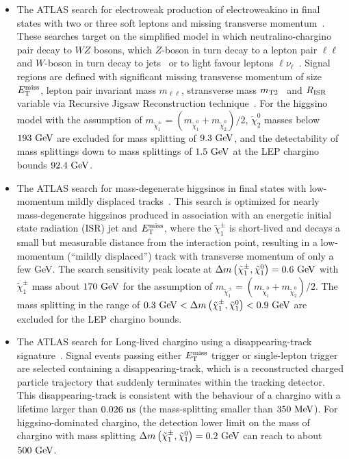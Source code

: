 \documentclass[letterpaper,11pt]{article}
\begin{document}
\begin{itemize}
	\item The ATLAS search for electroweak production of electroweakino in final states with two or three soft leptons and missing transverse momentum~\cite{ATLAS:2021moa, ATLAS:2019lng}. These searches target on the simplified model in which neutralino-chargino pair decay to $WZ$ bosons, which $Z$-boson in turn decay to a lepton pair $\ell\ell$ and $W$-boson in turn decay to jets~\cite{ATLAS:2019lng} or to light favour leptons $\ell\nu_\ell$~\cite{ATLAS:2021moa}. Signal regions are defined with significant missing transverse momentum of size $E_{\rm T}^{\rm miss}$, lepton pair invariant mass $m_{\ell\ell}$, stransverse mass $m_{\rm T2}$~\cite{Barr:2003rg, Lester:1999tx} and $R_{\rm ISR}$ variable via Recursive Jigsaw Reconstruction technique~\cite{Jackson:2017gcy}. For the higgsino model with the assumption of $m_{\tilde{\chi}_1^\pm} = \left( m_{\tilde{\chi}_1^0} + m_{\tilde{\chi}_2^0} \right) \big/2$, $\tilde{\chi}_2^0$ masses below $193~{\rm GeV}$ are excluded for mass splitting of $9.3~{\rm GeV}$, and the detectability of mass splittings down to mass splittings of $1.5~{\rm GeV}$ at the LEP chargino bounds $92.4~{\rm GeV}$.
	
    \item The ATLAS search for mass-degenerate higgsinos in final states with low-momentum mildly displaced tracks~\cite{ATLAS:2024umc}. This search is optimized for nearly mass-degenerate higgsinos produced in association with an energetic initial state radiation (ISR) jet and $E_{\rm T}^{\rm miss}$, where the $\tilde{\chi}_1^\pm$ is short-lived and decays a small but measurable distance from the interaction point, resulting in a low-momentum (“mildly displaced”) track with transverse momentum of only a few GeV. The search sensitivity peak locate at $\Delta m \left( \tilde{\chi}_1^\pm, \tilde{\chi}_1^0 \right) = 0.6~{\rm GeV}$ with $\tilde{\chi}_1^\pm$ mass about $170~{\rm GeV}$ for the assumption of $m_{\tilde{\chi}_1^\pm} = \left( m_{\tilde{\chi}_1^0} + m_{\tilde{\chi}_2^0} \right) \big/2$. The mass splitting in the range of $0.3~{\rm GeV} < \Delta m \left( \tilde{\chi}_1^\pm, \tilde{\chi}_1^0 \right) < 0.9~{\rm GeV}$ are excluded for the LEP chargino bounds.  
	
	\item The ATLAS search for Long-lived chargino using a disappearing-track signature~\cite{ATLAS:2022rme}. Signal events passing either $E_{\rm T}^{\rm miss}$ trigger or single-lepton trigger are selected containing a disappearing-track, which is a reconstructed charged particle trajectory that suddenly terminates within the tracking detector. This disappearing-track is consistent with the behaviour of a chargino with a lifetime larger than $0.026~{\rm ns}$ (the mass-splitting smaller than $350~{\rm MeV}$). For higgsino-dominated chargino, the detection lower limit on the mass of chargino with mass splitting $\Delta m \left( \tilde{\chi}_1^\pm, \tilde{\chi}_1^0 \right) = 0.2~{\rm GeV}$ can reach to about $500~{\rm GeV}$.  


\end{itemize}
\end{document}
